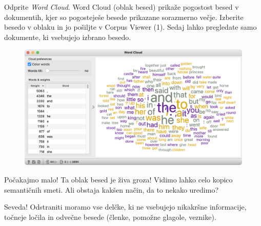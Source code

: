 Odprite \textit{Word Cloud}. Word Cloud (oblak besed) prikaže pogostost besed v dokumentih, kjer so pogosteješe besede prikazane sorazmerno večje. Izberite besedo v oblaku in jo pošiljte v Corpus Viewer (1). Sedaj lahko pregledate samo dokumente, ki vsebujejo izbrano besedo.

\newpage

\begin{figure}[h]
  \centering
  \includegraphics[width=\linewidth]{word-cloud.png}
\end{figure}

Počakajmo malo! Ta oblak besed je živa groza! Vidimo lahko celo kopico semantičnih smeti.  Ali obstaja kakšen način, da to nekako uredimo?

Seveda! Odstraniti moramo vse delčke, ki ne vsebujejo nikakršne informacije, točneje ločila in odvečne besede (členke, pomožne glagole, veznike).